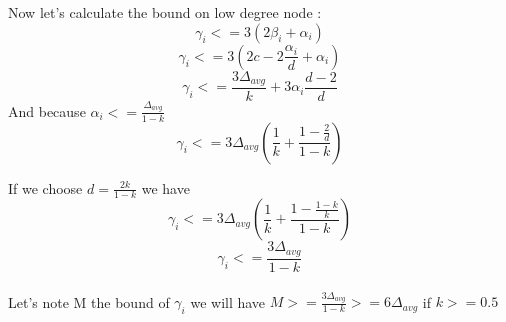 \documentclass{article}
\begin{document}
Now let's calculate the bound on low degree node :
$$\gamma_i <= 3(2\beta_i+\alpha_i)$$
$$\gamma_i <= 3(2c - 2\frac{\alpha_i}{d} + \alpha_i)$$
$$\gamma_i <= \frac{3\Delta_{avg}}{k} + 3\alpha_i\frac{d-2}{d}$$
And because $\alpha_i <= \frac{\Delta_{avg}}{1-k}$
$$\gamma_i <= 3\Delta_{avg}\left(\frac{1}{k}+\frac{1-\frac{2}{d}}{1-k}\right)$$


If we choose $d = \frac{2k}{1-k}$ we have
$$\gamma_i <= 3\Delta_{avg}\left(\frac{1}{k}+\frac{1-\frac{1-k}{k}}{1-k}\right)$$
$$\gamma_i <= \frac{3\Delta_{avg}}{1-k}$$\\
Let's note M the bound of $\gamma_i$ we will have
$ M >= \frac{3\Delta_{avg}}{1-k} >= 6\Delta_{avg}$ if $k >= 0.5$
\end{document}
